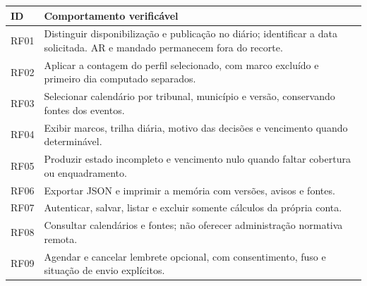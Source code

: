 \begin{quadro}[H]\centering
\caption{Requisitos funcionais do recorte entregue}
\label{quadro-1}
\begin{singlespace}\fontsize{10}{12}\selectfont
\begin{tabularx}{\linewidth}{|>{\raggedright\arraybackslash}X|>{\raggedright\arraybackslash}X|}
\hline
\textbf{ID} & \textbf{Comportamento verificável} \\
\hline
RF01 & Distinguir disponibilização e publicação no diário; identificar a data solicitada. AR e mandado permanecem fora do recorte. \\
\hline
RF02 & Aplicar a contagem do perfil selecionado, com marco excluído e primeiro dia computado separados. \\
\hline
RF03 & Selecionar calendário por tribunal, município e versão, conservando fontes dos eventos. \\
\hline
RF04 & Exibir marcos, trilha diária, motivo das decisões e vencimento quando determinável. \\
\hline
RF05 & Produzir estado incompleto e vencimento nulo quando faltar cobertura ou enquadramento. \\
\hline
RF06 & Exportar JSON e imprimir a memória com versões, avisos e fontes. \\
\hline
RF07 & Autenticar, salvar, listar e excluir somente cálculos da própria conta. \\
\hline
RF08 & Consultar calendários e fontes; não oferecer administração normativa remota. \\
\hline
RF09 & Agendar e cancelar lembrete opcional, com consentimento, fuso e situação de envio explícitos. \\
\hline
\end{tabularx}\end{singlespace}
\par{}
\end{quadro}
